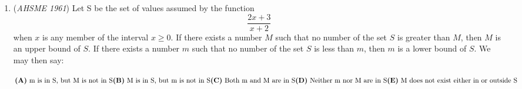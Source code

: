 \begin{enumerate}
 Suppose $x<0$. Then
 \[0<2^{2x}<1 \qquad\text{and}\qquad 3^{2y}>0.\]Therefore
 \[2^{2x}-3^{2y}<1,\]which cannot equal $55$. Hence $x\geq 0$.

 Since $x\geq 0$, the number $2^{2x}$ is an integer. Thus
 \[3^{2y}=2^{2x}-55\]must also be an integer. However, if $y<0$, then
 \[3^{2y}=\frac{1}{3^{-2y}}\]is a proper fraction. This is impossible, so $y\geq 0$.

 \textbf{Step 2: Factor the equation}

 Set
 \[a=2^x \qquad\text{and}\qquad b=3^y.\]Now $a$ and $b$ are positive integers, and
 \[a^2-b^2=55.\]Factoring gives
 \[(a-b)(a+b)=55.\]

 \textbf{Step 3: Check the factor pairs}

 Because $a>b>0$, both factors are positive. The only possibilities are
 \[(a-b,a+b)=(1,55) \qquad\text{or}\qquad (5,11).\]

            \begin{itemize}
        \item If $(a-b,a+b)=(1,55)$, then $(a,b)=(28,27)$. This is impossible because $28$ is not a power of $2$.
        \item If $(a-b,a+b)=(5,11)$, then $(a,b)=(8,3)$. Therefore
            \end{itemize}
            
 \[2^x=8 \qquad\text{and}\qquad 3^y=3,\]so
 \[x=3 \qquad\text{and}\qquad y=1.\]

 \textbf{Conclusion}

 The only integer solution is
 \[\boxed{(x,y)=(3,1)}.\]Therefore, the number of solutions is $\boxed{1}$, and the answer is $\boxed{\textbf{(B)}}$.

 


	\item (\textit{AHSME 1961}) Let S be the set of values assumed by the function 
 \[\frac{2x+3}{x+2}\]
when $x$ is any member of the interval $x \ge 0$. If there exists a number $M$ such that no number of the set $S$ is greater than $M$, 
then $M$ is an upper bound of $S$. If there exists a number $m$ such that no number of the set $S$ is less than $m$, 
then $m$ is a lower bound of $S$. We may then say:


 $\textbf{(A)}\ \text{m is in S, but M is not in S}\qquad\\ \textbf{(B)}\ \text{M is in S, but m is not in S}\qquad\\ \textbf{(C)}\ \text{Both m and M are in S}\qquad\\ \textbf{(D)}\ \text{Neither m nor M are in S}\qquad\\ \textbf{(E)}\ \text{M does not exist either in or outside S}$


\end{enumerate}
